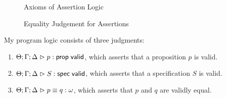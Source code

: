 \begin{figure}
\caption{Axioms of Assertion Logic}
\label{assertion-logic-axioms}  
\end{figure}

\begin{figure}
\caption{Equality Judgement for Assertions}
\label{assertion-equality}  
\end{figure}


My program logic consists of three judgments:

\begin{enumerate}
\item ${\Theta; \Gamma; \Delta} \vartriangleright {p} : \mathsf{prop} \;\mathsf{valid}$, which asserts that a proposition $p$ is valid.

\item ${\Theta; \Gamma; \Delta} \vartriangleright {S} : \mathsf{spec} \;\mathsf{valid}$, which asserts that a specification $S$ is valid.

\item ${\Theta; \Gamma; \Delta} \vartriangleright {p} \equiv {q} : {\omega}$, which asserts that $p$ and $q$ are validly equal.
\end{enumerate}
%

